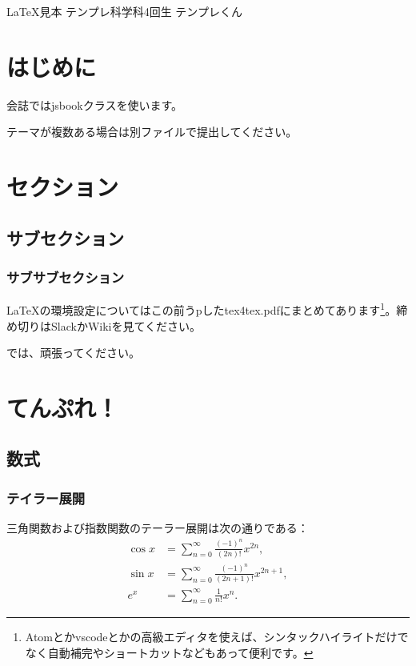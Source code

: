 \documentclass[10pt,b5paper,papersize,dvipdfmx]{jsbook}
\begin{document}

\kaishititle%
  {\LaTeX 見本}%
  {テンプレ科学科4回生}%
  {テンプレくん}%


%
\section*{はじめに}
会誌ではjsbookクラスを使います。\par
テーマが複数ある場合は別ファイルで提出してください。

%
\section{セクション}
\subsection{サブセクション}
\subsubsection{サブサブセクション}
LaTeXの環境設定についてはこの前うpしたtex4tex.pdfにまとめてあります\footnote{Atomとかvscodeとかの高級エディタを使えば、シンタックハイライトだけでなく自動補完やショートカットなどもあって便利です。}。締め切りはSlackかWikiを見てください。\par
では、頑張ってください。

%
\section{てんぷれ！}

%
\subsection{数式}

%
\subsubsection{テイラー展開}
三角関数および指数関数のテーラー展開は次の通りである：
\begin{align}
    \cos x &= \sum_{n=0}^\infty \frac{(-1)^n}{(2n)!} x^{2n}, \label{eq:cos}\\
    \sin x &= \sum_{n=0}^\infty \frac{(-1)^n}{(2n+1)!} x^{2n+1}, \label{eq:sin}\\
    e^x &= \sum_{n=0}^\infty \frac{1}{n!} x^n. \label{eq:exp}
\end{align}
\end{document}
